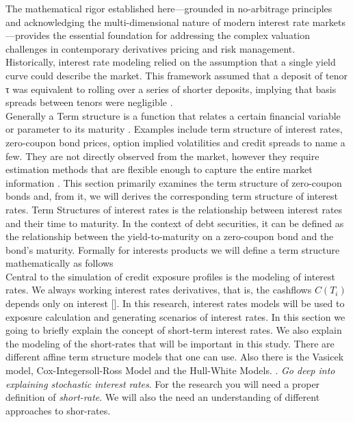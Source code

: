    The mathematical rigor established here—grounded in no-arbitrage principles and acknowledging the multi-dimensional nature of modern interest rate markets—provides the essential foundation for addressing the complex valuation challenges in contemporary derivatives pricing and risk management.\\
        
    \noindent
     Historically, interest rate modeling relied on the assumption that a single yield curve could describe the market. This framework assumed that a deposit of tenor τ was equivalent to rolling over a series of shorter deposits, implying that basis spreads between tenors were negligible \cite{avsar2015logic}. \\
    
    \noindent
    Generally a Term structure is a function that relates a certain financial variable or parameter to its maturity \cite{filipovic2009term}. Examples include term structure of interest rates, zero-coupon bond prices, option implied volatilities and credit spreads to name a few. They are not directly observed from the market, however they require estimation methods that are flexible enough to capture the entire market information \cite{filipovic2009term}. This section primarily examines the term structure of zero-coupon bonds and, from it, we will derives the corresponding term structure of interest rates. Term Structures of interest rates is the relationship between interest rates and their time to maturity. In the context of debt securities, it can be defined as the relationship between the yield-to-maturity on a zero-coupon bond and the bond's maturity. Formally for interests products we will define a term structure mathematically as follows\\
    


    
    

    

    Central to the simulation of credit exposure profiles is the modeling of interest rates. We always working interest rates derivatives, that is, the cashflows $C(T_i)$ depends only on interest [\cite{yasuoka2018evaluating}]. In this research, interest rates models will be used to exposure calculation and generating scenarios of interest rates. In this section we going to briefly explain the concept  of short-term interest rates. We also explain the modeling of the short-rates that will be important in this study. There are different affine term structure models that one can use. Also there is the Vasicek model, Cox-Integersoll-Ross Model and the Hull-White Models.   . \textit{Go deep into explaining stochastic interest rates}. For the research you will need a proper definition of \textit{short-rate}. We will also the need an understanding of different approaches to shor-rates.  \\

